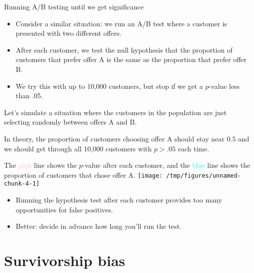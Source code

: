 \documentclass{beamer}\usepackage[]{graphicx}\usepackage[]{color}
\makeatletter
\def\maxwidth{ %
  \ifdim\Gin@nat@width>\linewidth
    \linewidth
  \else
    \Gin@nat@width
  \fi
}
\newenvironment{knitrout}{}{} %
\makeatother
\begin{document}
\begin{darkframes}
    \begin{frame}{Running A/B testing until we get significance}
      \begin{itemize}[<+->]
        \item Consider a similar situation: we run an A/B test where a customer is presented with two different offers.
        \item After each customer, we test the null hypothesis that the proportion of customers that prefer offer A is the same as the proportion that prefer offer B.
        \item We try this with up to 10,000 customers, but stop if we get a $p$-value less than .05.
      \end{itemize}
    \end{frame}

    \begin{frame}
      Let's simulate a situation where the customers in the population are just selecting randomly between offers A and B.

      \bigskip\pause

      In theory, the proportion of customers choosing offer A should stay near $0.5$ and we should get through all 10,000 customers with $p>.05$ each time.
    \end{frame}

    \begin{frame}
      The \textcolor{pink}{pink} line shows the $p$-value after each customer, and the \textcolor{cyan}{blue} line shows the proportion of customers that chose offer A.
\begin{knitrout}
\color{fgcolor}
\texttt{[image: /tmp/figures/unnamed-chunk-4-1]} 

\end{knitrout}
    \end{frame}

    \begin{frame}
      \begin{itemize}
        \item Running the hypothesis test after each customer provides too many opportunities for false positives.
        \item Better: decide in advance how long you'll run the test.
      \end{itemize}
    \end{frame}

    \section{Survivorship bias}


\end{darkframes}
\end{document}
